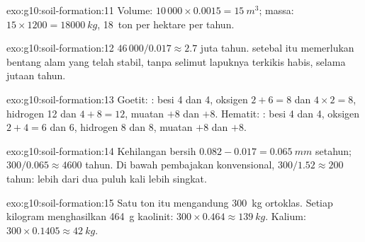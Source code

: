 \begin{solution}{exo:g10:soil-formation:11}
Volume: $10\,000 \times 0.0015 = \qty{15}{m^3}$; massa: $15 \times 1200 =
\qty{18000}{kg}$, \num{18}~ton per hektare per tahun.
\end{solution}

\begin{solution}{exo:g10:soil-formation:12}
$46\,000/0.017 \approx 2.7$ juta tahun.  setebal itu memerlukan bentang
alam yang telah stabil, tanpa selimut lapuknya terkikis habis, selama jutaan
tahun.
\end{solution}

\begin{solution}{exo:g10:soil-formation:13}
Goetit: : besi 4 dan 4,
oksigen $2 + 6 = 8$ dan $4 \times 2 = 8$, hidrogen 12 dan $4 + 8 = 12$, muatan
$+8$ dan $+8$. Hematit: : besi 4
dan 4, oksigen $2 + 4 = 6$ dan 6, hidrogen 8 dan 8, muatan $+8$ dan $+8$.
\end{solution}

\begin{solution}{exo:g10:soil-formation:14}
Kehilangan bersih $0.082 - 0.017 = \qty{0.065}{mm}$ setahun; $300/0.065 \approx 4600$
tahun. Di bawah pembajakan konvensional, $300/1.52 \approx 200$ tahun: lebih
dari dua puluh kali lebih singkat.
\end{solution}

\begin{solution}{exo:g10:soil-formation:15}
Satu ton itu mengandung \qty{300}{kg} ortoklas. Setiap kilogram menghasilkan
\qty{464}{g} kaolinit: $300 \times 0.464 \approx \qty{139}{kg}$. Kalium:
$300 \times 0.1405 \approx \qty{42}{kg}$.
\end{solution}

